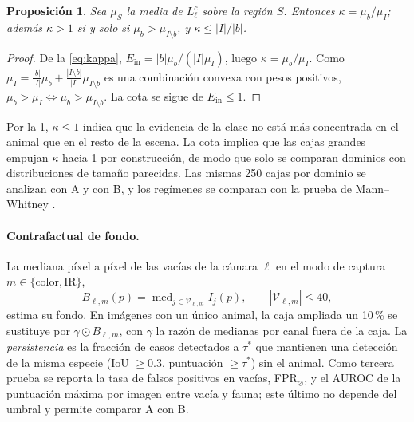 \documentclass{article}
\newtheorem{proposicion}{Proposición}
\DeclareMathOperator{\med}{med}
\begin{document}
\begin{proposicion}
\label{prop:kappa}
Sea \(\mu_S\) la media de \(L^c_\ell\) sobre la región \(S\). Entonces \(\kappa = \mu_b/\mu_I\); además \(\kappa > 1\) si y solo si \(\mu_b > \mu_{I\setminus b}\), y \(\kappa \le |I|/|b|\).
\end{proposicion}
\begin{proof}
De la \cref{eq:kappa}, \(E_{\mathrm{in}} = |b|\mu_b / (|I|\mu_I)\), luego \(\kappa = \mu_b/\mu_I\). Como \(\mu_I = \frac{|b|}{|I|}\mu_b + \frac{|I\setminus b|}{|I|}\mu_{I\setminus b}\) es una combinación convexa con pesos positivos, \(\mu_b > \mu_I \iff \mu_b > \mu_{I\setminus b}\). La cota se sigue de \(E_{\mathrm{in}} \le 1\).
\end{proof}
Por la \cref{prop:kappa}, \(\kappa\le1\) indica que la evidencia de la clase no está más concentrada en el animal que en el resto de la escena. La cota implica que las cajas grandes empujan \(\kappa\) hacia 1 por construcción, de modo que solo se comparan dominios con distribuciones de tamaño parecidas. Las mismas 250 cajas por dominio se analizan con A y con B, y los regímenes se comparan con la prueba de Mann--Whitney \parencite{mann1947}.

\paragraph{Contrafactual de fondo.} La mediana píxel a píxel de las vacías de la cámara \(\ell\) en el modo de captura \(m\in\{\text{color},\text{IR}\}\),
\begin{equation}
  B_{\ell,m}(p) = \med_{j \in \mathcal{V}_{\ell,m}} I_j(p), \qquad |\mathcal{V}_{\ell,m}| \le 40,
  \label{eq:fondo-mediana}
\end{equation}
estima su fondo. En imágenes con un único animal, la caja ampliada un 10\,\% se sustituye por \(\gamma \odot B_{\ell,m}\), con \(\gamma\) la razón de medianas por canal fuera de la caja. La \emph{persistencia} es la fracción de casos detectados a \(\tau^\ast\) que mantienen una detección de la misma especie (IoU \(\ge 0.3\), puntuación \(\ge\tau^\ast\)) sin el animal. Como tercera prueba se reporta la tasa de falsos positivos en vacías, FPR\(_\varnothing\), y el AUROC de la puntuación máxima por imagen entre vacía y fauna; este último no depende del umbral y permite comparar A con B.
\end{document}

